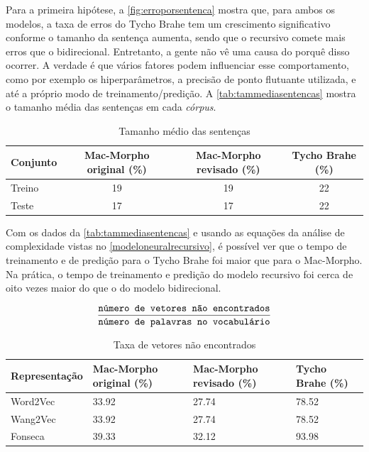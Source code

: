 Para a primeira hipótese, a \autoref{fig:erroporsentenca} mostra que, para ambos os modelos, a taxa de erros do Tycho Brahe tem um crescimento significativo conforme o tamanho da sentença aumenta, sendo que o recursivo comete mais erros que o bidirecional. Entretanto, a gente não vê uma causa do porquê disso ocorrer. A verdade é que vários fatores podem influenciar esse comportamento, como por exemplo os hiperparâmetros, a precisão de ponto flutuante utilizada, e até a próprio modo de treinamento/predição. A \autoref{tab:tammediasentencas} mostra o tamanho média das sentenças em cada \textit{córpus}.



\begin{table}[!htb]
\footnotesize
\centering
\caption{Tamanho médio das sentenças}
\label{tab:tammediasentencas}
\begin{tabular}{lccc}
  \toprule
  \textbf{Conjunto} & \textbf{Mac-Morpho original (\%)}  & \textbf{Mac-Morpho revisado (\%)} & \textbf{Tycho Brahe (\%)} \\
  \midrule
  Treino & 19 & 19 & 22 \\ 
  Teste  & 17 & 17 & 22 \\ 
  \bottomrule
\end{tabular}
\end{table}


Com os dados da \autoref{tab:tammediasentencas} e usando as equações da análise de complexidade vistas no \autoref{modeloneuralrecursivo}, é possível ver que o tempo de treinamento e de predição para o Tycho Brahe foi maior que para o Mac-Morpho. Na prática, o tempo de treinamento e predição do modelo recursivo foi cerca de oito vezes maior do que o do modelo bidirecional.


\begin{equation} \label{eq:taxadevetoresnaoencontradoseq}
\frac{\mbox{\texttt{número de vetores não encontrados}}}{\mbox{\texttt{número de palavras no vocabulário}}}
\end{equation}

\begin{table}[!htb]
\footnotesize
\centering
\caption{Taxa de vetores não encontrados}
\label{tab:vetoresnaoencontrados}
\begin{tabular}{lP{3cm}P{3cm}P{3cm}}
  \toprule
  \textbf{Representação} & \textbf{Mac-Morpho original (\%)}  & \textbf{Mac-Morpho revisado (\%)} & \textbf{Tycho Brahe (\%)} \\
  \midrule
  Word2Vec  & 33.92 & 27.74 & 78.52 \\ 
  Wang2Vec  & 33.92 & 27.74 & 78.52 \\
  Fonseca 	& 39.33 & 32.12 & 93.98 \\
  \bottomrule
\end{tabular}
\end{table}


